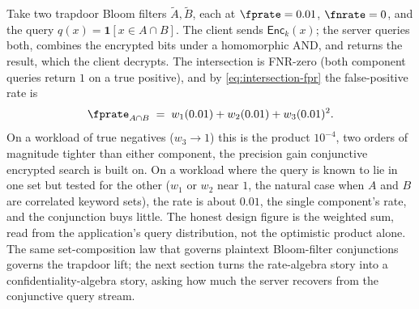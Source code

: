 Take two trapdoor Bloom filters $\tilde A, \tilde B$, each at $\fprate =
0.01$, $\fnrate = 0$, and the query $q(x) = \mathbf{1}[x \in A \cap B]$.
The client sends $\mathsf{Enc}_k(x)$; the server queries both, combines
the encrypted bits under a homomorphic AND, and returns the result, which
the client decrypts. The intersection is FNR-zero (both component queries
return $1$ on a true positive), and by \eqref{eq:intersection-fpr} the
false-positive rate is
\[
  \fprate_{A \cap B} \;=\; w_1 (0.01) + w_2 (0.01) + w_3 (0.01)^2.
\]
On a workload of true negatives ($w_3 \to 1$) this is the product $10^{-4}$,
two orders of magnitude tighter than either component, the precision
gain conjunctive encrypted search is built on. On a workload where the
query is known to lie in one set but tested for the other ($w_1$ or $w_2$
near $1$, the natural case when $A$ and $B$ are correlated keyword sets),
the rate is about $0.01$, the single component's rate, and the
conjunction buys little. The honest design figure is the weighted sum,
read from the application's query distribution, not the optimistic product
alone. The same set-composition law that governs plaintext Bloom-filter
conjunctions governs the trapdoor lift; the next section turns the
rate-algebra story into a confidentiality-algebra story, asking how much
the server recovers from the conjunctive query stream.
